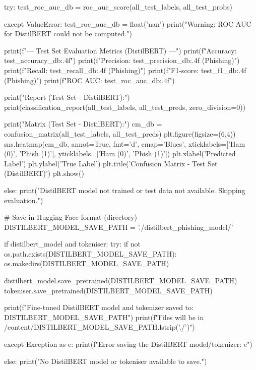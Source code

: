\begin{ffcode}
    try:
        test_roc_auc_db = roc_auc_score(all_test_labels, all_test_probs)

    except ValueError:
        test_roc_auc_db = float('nan')
        print("Warning: ROC AUC for DistilBERT could not be computed.")


    print(f"\n--- Test Set Evaluation Metrics (DistilBERT) ---")
    print(f"Accuracy:  {test_accuracy_db:.4f}")
    print(f"Precision: {test_precision_db:.4f} (Phishing)")
    print(f"Recall:    {test_recall_db:.4f} (Phishing)")
    print(f"F1-score:  {test_f1_db:.4f} (Phishing)")
    print(f"ROC AUC:   {test_roc_auc_db:.4f}")

    print("\nClassification Report (Test Set - DistilBERT):")
    print(classification_report(all_test_labels, all_test_preds, zero_division=0))

    print("\nConfusion Matrix (Test Set - DistilBERT):")
    cm_db = confusion_matrix(all_test_labels, all_test_preds)
    plt.figure(figsize=(6,4))
    sns.heatmap(cm_db, annot=True, fmt='d', cmap='Blues', xticklabels=['Ham (0)', 'Phish (1)'], yticklabels=['Ham (0)', 'Phish (1)'])
    plt.xlabel('Predicted Label')
    plt.ylabel('True Label')
    plt.title('Confusion Matrix - Test Set (DistilBERT)')
    plt.show()

else:
    print("DistilBERT model not trained or test data not available. Skipping evaluation.")

# Save in Hugging Face format (directory)
DISTILBERT_MODEL_SAVE_PATH = './distilbert_phishing_model/'

if distilbert_model and tokeniser:
    try:
        if not os.path.exists(DISTILBERT_MODEL_SAVE_PATH):
            os.makedirs(DISTILBERT_MODEL_SAVE_PATH)

        distilbert_model.save_pretrained(DISTILBERT_MODEL_SAVE_PATH)
        tokeniser.save_pretrained(DISTILBERT_MODEL_SAVE_PATH)

        print(f"Fine-tuned DistilBERT model and tokenizer saved to: {DISTILBERT_MODEL_SAVE_PATH}")
        print(f"Files will be in /content/{DISTILBERT_MODEL_SAVE_PATH.lstrip('./')}")

    except Exception as e:
        print(f"Error saving the DistilBERT model/tokenizer: {e}")

else:
    print("No DistilBERT model or tokeniser available to save.")
\end{ffcode}